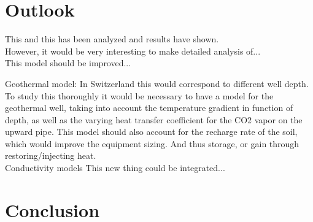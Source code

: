 \documentclass{article}
\begin{document}
\section{Outlook}
This and this has been analyzed and results have shown.\\

However, it would be very interesting to make detailed analysis of...\\

This model should be improved...

Geothermal model: In Switzerland this would correspond to different well depth. To study this thoroughly it would be necessary to have a model for the geothermal well, taking into account the temperature gradient in function of depth, as well as the varying heat transfer coefficient for the CO2 vapor on the upward pipe\cite{badacheExperimentalStudyCarbon2018,lamarcheReviewMethodsEvaluate2010}. This model should also account for the recharge rate of the soil, which would improve the equipment sizing. And thus storage, or gain through restoring/injecting heat.\\
Conductivity models \cite{jiaReviewEffectiveThermal2019,lamarcheReviewMethodsEvaluate2010,zengHeatTransferAnalysis2003a}
This new thing could be integrated...\\

\section{Conclusion}


\clearpage


\clearpage



\end{document}
